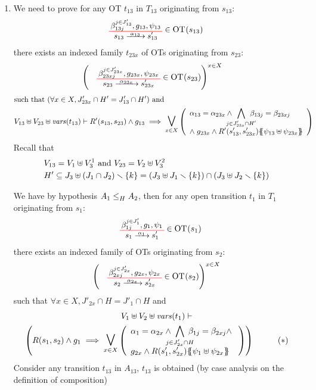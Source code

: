 \documentclass[runningheads]{llncs}
\begin{document}
\begin{enumerate}
\item We need to prove for any OT $t_{13}$ in $T_{13}$ originating from $s_{13}$:
\begin{align*}
		&  \OTx{13}{}{13}{13} \in \fOT{s_{13}}
\end{align*}		
there exists an indexed family $t_{23x}$ of OTs originating from $s_{23}$: 
\begin{align*}
		&  \mpar{\OTx{23}{x}{23x}{23x} \in \fOT{s_{23}}}^{x \in X}
\end{align*}	
\begin{align*}		
		& \text{such that } \mpar{\forall x \in X, J'_{23x} \cap H' = J'_{13} \cap H'} \text{ and }\\
		&  V_{13} \uplus V_{23} \uplus \fvars{t_{13}} \vdash R'\mpar{s_{13}, s_{23}} \wedge g_{13} \implies \operatorname*{\bigsymb{\bigvee}}_{x \in X} \mpar{\everymath{\displaystyle}\begin{array}{l}
			\alpha_{13} = \alpha_{23x} \wedge \bigwedge_\subbox{j \in J'_{23x} \cap H'} \beta_{13j} = \beta_{23xj} \\[12pt]
			\nwedge g_{23x} \wedge R'\mpar{s'_{13}, s'_{23x}}\psubst{\psi_{13} \uplus \psi_{23x}}
		\end{array}} 
	\end{align*}
Recall that 
\begin{align*}
&V_{13}= V_1\uplus V^1_3 \text{ and }
V_{23}= V_2\uplus V^2_3\\
& H' \subseteq J_3\uplus \mpar{J_1 \cap J_2} \setminus \{k\} = \mpar{J_3\uplus J_1 \setminus \{k\} } \cap \mpar{J_3\uplus J_2 \setminus \{k\}} \\
\end{align*}

\medskip

We have by hypothesis $\wrel{A_1}{A_2}{H}$, then for any open transition $t_1$ in $T_1$  originating from $s_1$:
\begin{align*}
\OTx{1}{}{1}{1} \in \fOT{s_1}
\end{align*}
there exists an indexed family of OTs originating from $s_{2}$: 
\begin{align*}
\mpar{\OTx{2}{x}{2x}{2x} \in \fOT{s_{2}}}^{x \in X} 
\end{align*}
such that $\forall x \in X, J'_{2x} \cap H = J'_1 \cap H$ and
\begin{multline*}
V_1 \uplus V_2 \uplus \fvars{t_1} \vdash\\ \mpar{R\mpar{s_1, s_{2}} \wedge g_1 \implies \operatorname*{\bigsymb{\bigvee}}_{x \in X} \mpar{\everymath{\displaystyle}
\begin{array}{l}
			\alpha_1 = \alpha_{2x} \wedge \bigwedge_\subbox{j \in J'_{2x} \cap H} \beta_{1j} = \beta_{2xj} \nwedge\\
			 g_{2x} \wedge R\mpar{s'_1, s'_{2x}}\psubst{\psi_1 \uplus \psi_{2x}}
		\end{array}}}  \qquad \quad (*)
\end{multline*}	
\smallskip
Consider any transition $t_{13}$ in $A_{13}$,  $t_{13}$ is obtained (by case analysis on the definition of composition) 


\end{enumerate}
\end{document}
